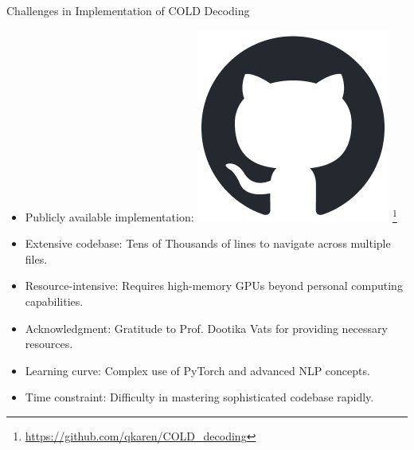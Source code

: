 \documentclass{beamer}
\begin{document}
\begin{frame}{Challenges in Implementation of COLD Decoding}
    \begin{itemize}
        \item Publicly available implementation: \includegraphics[scale=0.2]{github-mark.png} \footnote{\url{https://github.com/qkaren/COLD_decoding}}

        \item Extensive codebase: Tens of Thousands of lines to navigate across multiple files.
        \item Resource-intensive: Requires high-memory GPUs beyond personal computing capabilities.
        \item Acknowledgment: Gratitude to Prof. Dootika Vats for providing necessary resources.
        \item Learning curve: Complex use of PyTorch and advanced NLP concepts.
        \item Time constraint: Difficulty in mastering sophisticated codebase rapidly.
    \end{itemize}
\end{frame}
\end{document}

